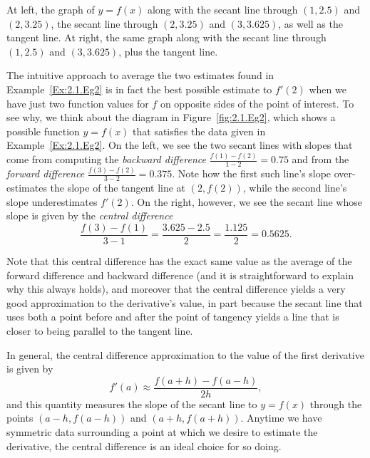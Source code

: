 
\begin{marginfigure}[1cm] %
\caption{At left, the graph of $y = f(x)$ along with the secant line through $(1,2.5)$ and $(2,3.25)$, the secant line through $(2, 3.25)$ and $(3,3.625)$, as well as the tangent line.  At right, the same graph along with the secant line through $(1,2.5)$ and $(3,3.625)$, plus the tangent line.}\label{fig:2.1.Eg2}
\end{marginfigure}

The intuitive approach to average the two estimates found in Example~\ref{Ex:2.1.Eg2} is in fact the best possible estimate to $f'(2)$ when we have just two function values for $f$ on opposite sides of the point of interest.  To see why, we think about the diagram in Figure~\ref{fig:2.1.Eg2}, which shows a possible function $y = f(x)$ that satisfies the data given in Example~\ref{Ex:2.1.Eg2}.  On the left, we see the two secant lines with slopes that come from computing the \emph{backward difference}  $\frac{f(1)-f(2)}{1-2} = 0.75$ and from the \emph{forward difference}  $\frac{f(3)-f(2)}{3-2} = 0.375.$  Note how the first such line's slope over-estimates the slope of the tangent line at $(2,f(2))$, while the second line's slope underestimates $f'(2)$.  On the right, however, we see the secant line whose slope is given by the \emph{central difference}  
\[ \frac{f(3)-f(1)}{3-1} = \frac{3.625-2.5}{2} = \frac{1.125}{2} = 0.5625.\]

Note that this central difference has the exact same value as the average of the forward difference and backward difference (and it is straightforward to explain why this always holds), and moreover that the central difference yields a very good approximation to the derivative's value, in part because the secant line that uses both a point before and after the point of tangency yields a line that is closer to being parallel to the tangent line.  

In general, the central difference approximation to the value of the first derivative is given by 
$$f'(a) \approx \frac{f(a+h) - f(a-h)}{2h},$$
and this quantity measures the slope of the secant line to $y = f(x)$ through the points $(a-h, f(a-h))$ and $(a+h, f(a+h))$. Anytime we have symmetric data surrounding a point at which we desire to estimate the derivative, the central difference is an ideal choice for so doing.

